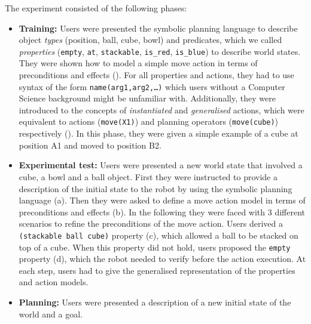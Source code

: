 The experiment consisted of the following phases:
\begin{itemize}
  \item{\begin{sloppypar} \textbf{Training:} Users were presented the symbolic planning language to describe object \textit{types} (\ie position, ball, cube, bowl) and predicates, which we called \textit{properties} (\ie \texttt{empty}, \texttt{at}, \texttt{stackable}, \texttt{is\_red}, \texttt{is\_blue}) to describe world states.
They were shown how to model a simple move action in terms of preconditions and effects ().
For all properties and actions, they had to use syntax of the form \texttt{name(arg1,arg2,\dots)} which users without a  Computer Science background might be unfamiliar with.
Additionally, they were introduced to the concepts of \textit{instantiated} and \textit{generalised} actions, which were equivalent to actions (\eg \texttt{move(X1)}) and planning operators (\eg \texttt{move(cube)}) respectively ().
In this phase, they were given a simple example of a cube at position A1 and moved to position B2.\end{sloppypar}
}
  \item{\textbf{Experimental test:} Users were presented a new world state that involved a cube, a bowl and a ball object. 
  	First they were instructed to provide a description of the initial state to the robot by using the symbolic planning language (a).
Then they were asked to define a move action model in terms of preconditions and effects (b).
In the following they were faced with 3 different scenarios to refine the preconditions of the move action.
Users derived a \texttt{(stackable ball cube)} property (c), which allowed a ball to be stacked on top of a cube.
When this property did not hold, users proposed the \texttt{empty} property (d), which the robot needed to verify before the action execution.
At each step, users had to give the generalised representation of the properties and action models.}
  \item{\textbf{Planning:} Users were presented a description of a new initial state of the world and a goal.
}
\end{itemize}
